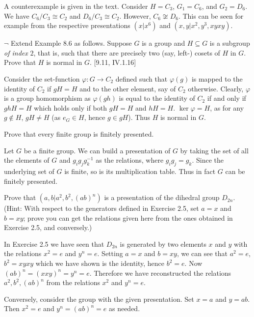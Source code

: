 \begin{solution}
	A counterexample is given in the text. Consider $H = C_3$, $G_1 = C_6$, and $G_2 = D_6$. We have $C_6/C_3 \cong C_2$ and $D_6/C_3 \cong C_2$. However, $C_6 \not \cong D_6$. This can be seen for example from the respective presentations $(x | x^6)$ and $(x, y | x^2, y^3, xyxy)$.
\end{solution}

\begin{problem}
	$\neg$ Extend Example 8.6 as follows. Suppose $G$ is a group and $H \subseteq G$ is a subgroup \emph{of index} $2$, that is, such that there are precisely two (say, left-) cosets of $H$ in $G$. Prove that $H$ is normal in $G$. [9.11, IV.1.16]
\end{problem}

\begin{solution}
	Consider the set-function $\varphi: G \to C_2$ defined such that $\varphi(g)$ is mapped to the identity of $C_2$ if $gH = H$ and to the other element, say of $C_2$ otherwise. Clearly, $\varphi$ is a group homomorphism as $\varphi(gh)$ is equal to the identity of $C_2$ if and only if $ghH = H$ which holds only if both $gH = H$ and $hH = H$. $\ker \varphi = H$, as for any $g \not \in H$, $gH \neq H$ (as $e_G \in H$, hence $g \in gH$). Thus $H$ is normal in $G$.
\end{solution}

\begin{problem}
	Prove that every finite group is finitely presented.
\end{problem}

\begin{solution}
	Let $G$ be a finite group. We can build a presentation of $G$ by taking the set of all the elements of $G$ and $g_i g_j g_k^{-1}$ as the relations, where $g_i g_j = g_k$. Since the underlying set of $G$ is finite, so is its multiplication table. Thus in fact $G$ can be finitely presented.
\end{solution}

\begin{problem}
	Prove that $(a, b|a^2, b^2, (ab)^n)$ is a presentation of the dihedral group $D_{2n}$. (Hint: With respect to the generators defined in Exercise 2.5, set $a = x$ and $b = xy$; prove you can get the relations given here from the ones obtained in Exercise 2.5, and conversely.)
\end{problem}

\begin{solution}
	In Exercise 2.5 we have seen that $D_{2n}$ is generated by two elements $x$ and $y$ with the relations $x^2 = e$ and $y^n = e$. Setting $a = x$ and $b = xy$, we can see that $a^2 = e$, $b^2 = xyxy$ which we have shown is the identity, hence $b^2 = e$. Now $(ab)^n = (xxy)^n = y^n = e$. Therefore we have reconstructed the relations $a^2, b^2, (ab)^n$ from the relations $x^2$ and $y^n = e$.
	
	Conversely, consider the group with the given presentation. Set $x = a$ and $y = ab$. Then $x^2 = e$ and $y^n = (ab)^n = e$ as needed.
\end{solution}


